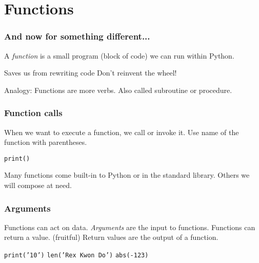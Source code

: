 \documentclass[11pt]{beamer}
\begin{document}
\section{Functions}

\begin{frame}
  \frametitle{And now for something different...}
  \Enlarge

  \begin{itemize}
  \myitem  A \emph{function} is a small program (block of code) we can run within Python. \pause
    \begin{itemize}
    \mysubitem  Saves us from rewriting code
    \mysubitem  Don't reinvent the wheel!
    \end{itemize} \pause
  \myitem  Analogy:  Functions are more verbs. \pause
  \myitem  Also called subroutine or procedure.
  \end{itemize}
\end{frame}

\begin{frame}
  \frametitle{Function calls}
  \Enlarge

  \begin{itemize}
  \myitem  When we want to execute a function, we call or invoke it. \pause
  \myitem  Use name of the function with parentheses. \pause
    \begin{itemize}
    \mysubitem  \texttt{print()}
    \end{itemize} \pause
  \myitem  Many functions come built-in to Python or in the standard library. \pause
  \myitem  Others we will compose at need.
  \end{itemize}
\end{frame}

\begin{frame}
  \frametitle{Arguments}
  \Enlarge

  \begin{itemize}
  \myitem  Functions can act on data. \pause
  \myitem  \emph{Arguments} are the input to functions. \pause
  \myitem  Functions can return a value.  (fruitful) \pause
  \myitem  Return values are the output of a function. \pause
    \begin{itemize}
    \mysubitem  \texttt{print('10')} \pause
    \mysubitem  \texttt{len('Rex Kwon Do')} \pause
    \mysubitem  \texttt{abs(-123)} \pause
    \end{itemize}
  \end{itemize}
\end{frame}
\end{document}
